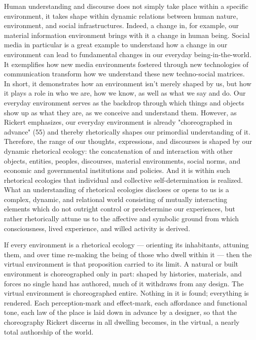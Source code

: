 \documentclass{article}
\begin{document}
Human understanding and discourse does not simply take place within a specific environment, it takes shape within dynamic relations between human nature, environment, and social infrastructures. Indeed, a change in, for example, our material information environment brings with it a change in human being. Social media in particular is a great example to understand how a change in our environment can lead to fundamental changes in our everyday being-in-the-world. It exemplifies how new media environments fostered through new technologies of communication transform how we understand these new techno-social matrices. In short, it demonstrates how an environment isn't merely shaped by us, but how it plays a role in who we are, how we know, as well as what we say and do. Our everyday environment serves as the backdrop through which things and objects show up as what they are, as we conceive and understand them. However, as Rickert emphasizes, our everyday environment is already "choreographed in advance" (55) and thereby rhetorically shapes our primordial understanding of it. Therefore, the range of our thoughts, expressions, and discourses is shaped by our dynamic rhetorical ecology: the concatenation of and interaction with other objects, entities, peoples, discourses, material environments, social norms, and economic and governmental institutions and policies. And it is within such rhetorical ecologies that individual and collective self-determination is realized. What an understanding of rhetorical ecologies discloses or opens to us is a complex, dynamic, and relational world consisting of mutually interacting elements which do not outright control or predetermine our experiences, but rather rhetorically attune us to the affective and symbolic ground from which consciousness, lived experience, and willed activity is derived.

If every environment is a rhetorical ecology — orienting its inhabitants, attuning them, and over time re-making the being of those who dwell within it — then the virtual environment is that proposition carried to its limit. A natural or built environment is choreographed only in part: shaped by histories, materials, and forces no single hand has authored, much of it withdraws from any design. The virtual environment is choreographed entire. Nothing in it is found; everything is rendered. Each perception-mark and effect-mark, each affordance and functional tone, each law of the place is laid down in advance by a designer, so that the choreography Rickert discerns in all dwelling becomes, in the virtual, a nearly total authorship of the world.
\end{document}
